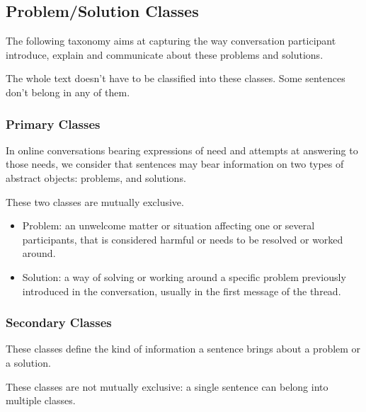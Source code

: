 \documentclass[11pt]{article}
\begin{document}
\subsection{Problem/Solution Classes}

The following taxonomy aims at capturing the way conversation participant introduce, explain and communicate about these problems and solutions.

The whole text doesn't have to be classified into these classes. Some sentences don't belong in any of them. 

\subsubsection{Primary Classes}

In online conversations bearing expressions of need and attempts at answering to those needs, we consider that sentences may bear information on two types of abstract objects: problems, and solutions.

These two classes are mutually exclusive.

\begin{itemize}
	\item Problem: an unwelcome matter or situation affecting one or several participants, that is considered harmful or needs to be resolved or worked around.
	\item Solution: a way of solving or working around a specific problem previously introduced in the conversation, usually in the first message of the thread.
\end{itemize}

\subsubsection{Secondary Classes}

These classes define the kind of information a sentence brings about a problem or a solution.

These classes are not mutually exclusive: a single sentence can belong into multiple classes.
\end{document}
